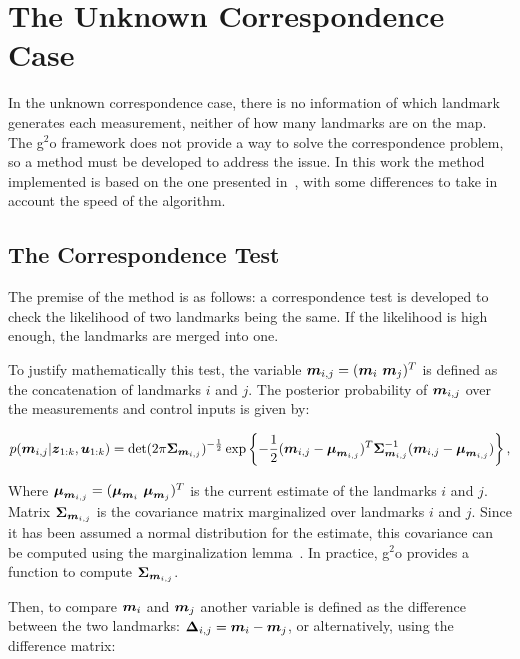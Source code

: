 \section{The Unknown Correspondence Case}

In the unknown correspondence case, there is no information of which landmark generates each measurement, neither of how many landmarks are on the map. The g$^2$o framework does not provide a way to solve the correspondence problem, so a method must be developed to address the issue. In this work the method implemented is based on the one presented in~\cite{graphslam}, with some differences to take in account the speed of the algorithm. 

\subsection{The Correspondence Test}

The premise of the method is as follows: a correspondence test is developed to check the likelihood of two landmarks being the same. If the likelihood is high enough, the landmarks are merged into one. 

To justify mathematically this test, the variable $\boldsymbol{m}_{i,j}=(\boldsymbol{m}_i~ \boldsymbol{m}_j)^T$ is defined as the concatenation of landmarks $i$ and $j$. The posterior probability of $\boldsymbol{m}_{i,j}$ over the measurements and control inputs is given by:

\begin{equation}
p(\boldsymbol{m}_{i,j}|\boldsymbol{z}_{1:k},\boldsymbol{u}_{1:k})=
\det(2\pi\boldsymbol{\Sigma}_{\boldsymbol{m}_{i,j}})^{-\frac{1}{2}}\exp\left\lbrace -\frac{1}{2}(\boldsymbol{m}_{i,j}-\boldsymbol{\mu}_{\boldsymbol{m}_{i,j}})^T
\boldsymbol{\Sigma}_{\boldsymbol{m}_{i,j}}^{-1}(\boldsymbol{m}_{i,j}-\boldsymbol{\mu}_{\boldsymbol{m}_{i,j}})\right\rbrace,
\label{eq:concatenate}
\end{equation}

\noindent
Where $\boldsymbol{\mu}_{\boldsymbol{m}_{i,j}}=(\boldsymbol{\mu}_{\boldsymbol{m}_i}~ \boldsymbol{\mu}_{\boldsymbol{m}_j})^T$ is the current estimate of the landmarks $i$ and $j$. Matrix $\boldsymbol{\Sigma}_{\boldsymbol{m}_{i,j}}$ is the covariance matrix marginalized over landmarks $i$ and $j$. Since it has been assumed a normal distribution for the estimate, this covariance can be computed using the marginalization lemma~\cite{graphslam}. In practice, g$^2$o provides a function to compute $\boldsymbol{\Sigma}_{\boldsymbol{m}_{i,j}}$.

Then, to compare $\boldsymbol{m}_i$ and $\boldsymbol{m}_j$ another variable is defined as the difference between the two landmarks: $\boldsymbol{\Delta}_{i,j}=\boldsymbol{m}_i-\boldsymbol{m}_j$, or alternatively, using the difference matrix:

